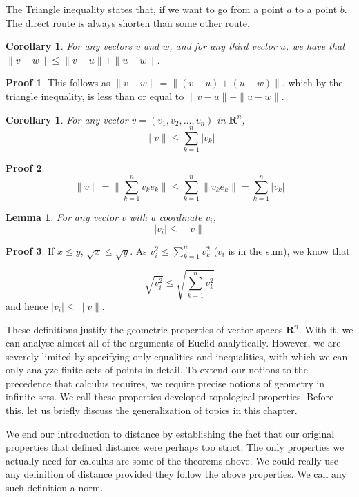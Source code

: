 \documentclass[12pt]{amsbook}
\theoremstyle{plain}
\newtheorem{lemma}[theorem]{Lemma}
\newtheorem{corollary}[theorem]{Corollary}
\theoremstyle{definition}
\newtheorem*{prf}{Proof}
\begin{document}
The Triangle inequality states that, if we want to go from a point $a$ to a point $b$. The direct route is always shorten than some other route.

\begin{corollary}
  For any vectors $v$ and $w$, and for any third vector $u$, we have that $\|v - w\| \leq \|v - u\| + \|u - w\|$.
\end{corollary}
\theoremstyle{definition}
\begin{prf}
  This follows as $\| v - w \| = \| (v - u) + (u - w) \|$, which by the triangle inequality, is less than or equal to $\| v - u \| + \| u - w \|$.
\end{prf}

\begin{corollary}
  For any vector $v = (v_1, v_2, \dots, v_n)$ in $\mathbf{R}^n$,
  \[ \|v\| \leq \sum_{k = 1}^n |v_k| \]
\end{corollary}
\begin{prf}
  \[ \| v \| = \| \sum_{k = 1}^n v_k e_k \| \leq \sum_{k = 1}^n \| v_k e_k \| = \sum_{k = 1}^n | v_k | \]
\end{prf}

\begin{lemma}
  For any vector $v$ with a coordinate $v_i$,
  \[ |v_i| \leq \| v \| \]
\end{lemma}
\begin{prf}
  If $x \leq y$, $\sqrt{x} \leq \sqrt{y}$. As $v_i^2 \leq \sum_{k=1}^n v_k^2$ ($v_i$ is in the sum), we know that
  \theoremstyle{definition}
  \[ \sqrt{v_i^2} \leq \sqrt{\sum_{k=1}^n v_k^2} \]
  and hence $|v_i| \leq \| v \|$.
\end{prf}

These definitions justify the geometric properties of vector spaces $\mathbf{R}^n$. With it, we can analyse almost all of the arguments of Euclid analytically. However, we are severely limited by specifying only equalities and inequalities, with which we can only analyze finite sets of points in detail. To extend our notions to the precedence that calculus requires, we require precise notions of geometry in infinite sets. We call these properties developed topological properties. Before this, let us briefly discuss the generalization of topics in this chapter.

We end our introduction to distance by establishing the fact that our original properties that defined distance were perhaps too strict. The only properties we actually need for calculus are some of the theorems above. We could really use any definition of distance provided they follow the above properties. We call any such definition a norm.
\end{document}
